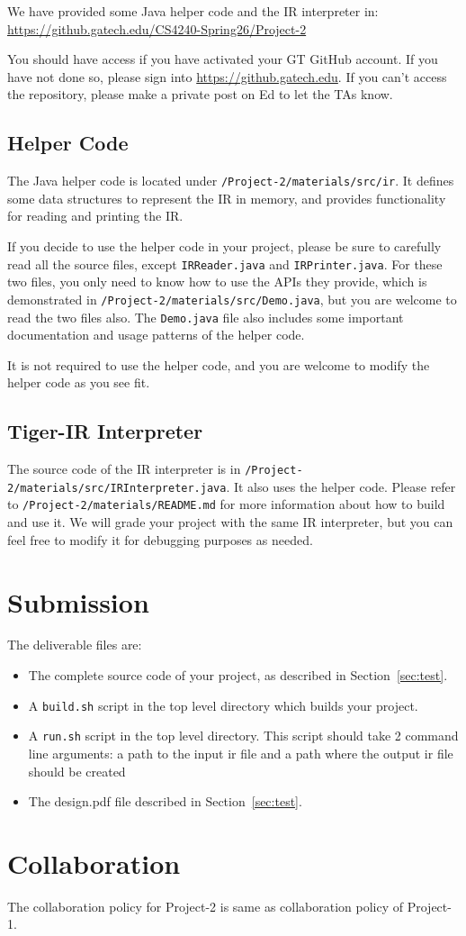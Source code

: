 \documentclass[12pt]{article}
\begin{document}
We have provided some Java helper code and the IR interpreter in:\\
\url{https://github.gatech.edu/CS4240-Spring26/Project-2}

You should have access if you have activated your GT GitHub account.
If you have not done so, please sign into \url{https://github.gatech.edu}. 
If you can't access the repository, please make a private post on Ed to let the TAs know.

\subsection{Helper Code}

The Java helper code is located under \texttt{/Project-2/materials/src/ir}.
It defines some data structures to represent the IR in memory,
and provides functionality for reading and printing the IR.

If you decide to use the helper code in your project, please be sure
to carefully read all the source files, except \texttt{IRReader.java} and \texttt{IRPrinter.java}.
For these two files, you only need to know how to use the APIs they provide,
which is demonstrated in \texttt{/Project-2/materials/src/Demo.java}, but you are
welcome to read the two files also.
The \texttt{Demo.java} file also includes some important documentation and usage patterns of the helper code.

It is not required to use the helper code, and you are welcome to
modify the helper code as you see fit.

\subsection{Tiger-IR Interpreter}

The source code of the IR interpreter is in \texttt{/Project-2/materials/src/IRInterpreter.java}.
It also uses the helper code.
Please refer to \texttt{/Project-2/materials/README.md} for more information about how to build and use it.
We will grade your project with the same IR interpreter, but you can
feel free to modify it for debugging purposes as needed.

\section{Submission}

The deliverable files are:
\begin{itemize}
    \item The complete source code of your project, as described in Section~\ref{sec:test}.
    \item A \texttt{build.sh} script in the top level directory which builds your project.
    \item A \texttt{run.sh} script in the top level directory. This script should take 2 command line arguments: a path to the input ir file and a path where the output ir file should be created

    \item The design.pdf file described in Section~\ref{sec:test}.
\end{itemize}

\section{Collaboration}
The collaboration policy for Project-2 is same as collaboration policy of Project-1.
\end{document}
